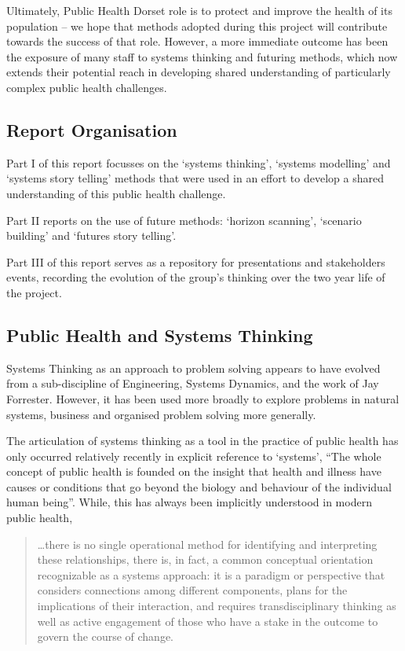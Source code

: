 Ultimately, Public Health Dorset role is to protect and improve the health of its population -- we hope that methods adopted during this project will contribute towards the success of that role. However, a more immediate outcome has been the exposure of many staff to systems thinking and futuring methods, which now extends their potential reach in developing shared understanding of particularly complex public health challenges.

\subsection{Report Organisation}

Part I of this report focusses on the `systems thinking', `systems modelling' and `systems story telling' methods that were used in an effort to develop a shared understanding of this public health challenge.

Part II reports on the use of future methods: `horizon scanning', `scenario building' and `futures story telling'.

Part III of this report serves as a repository for presentations and stakeholders events, recording the evolution of the group's thinking over the two year life of the project.

\subsection{Public Health and Systems Thinking}
Systems Thinking as an approach to problem solving appears to have evolved from a sub-discipline of Engineering, Systems Dynamics, and the work of Jay Forrester.\cite{WikipediaJWF} However, it has been used more broadly to explore problems in natural systems, business and organised problem solving more generally.\cite{Ford2010, Senge2006, MaaniCavana2007}

The articulation of systems thinking as a tool in the practice of public health has only occurred relatively recently in explicit reference to `systems', ``The whole concept of public health is founded on the insight that health and illness have causes or conditions that go beyond the biology and behaviour of the individual human being''.\cite{Midgley2006} While, this has always been implicitly understood in modern public health, 

\begin{quotation}
\ldots there is no single operational method for identifying and interpreting these relationships, there is, in fact, a common conceptual orientation recognizable as a systems approach: it is a paradigm or perspective that considers connections among different components, plans for the implications of their interaction, and requires transdisciplinary thinking as well as active engagement of those who have a stake in the outcome to govern the course of change.\cite{Leischow2006}
\end{quotation}

